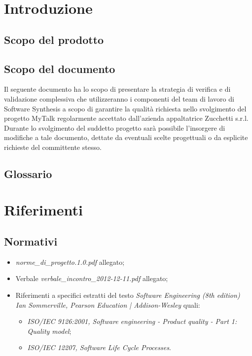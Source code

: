

\setcounter{page}{1}
\pagestyle{normal}

\section{Introduzione}
\subsection{Scopo del prodotto}
\purpose

\subsection{Scopo del documento}
Il seguente documento ha lo scopo di presentare la strategia di verifica e di validazione complessiva che utilizzeranno i componenti del team di lavoro di Software Synthesis a scopo di garantire la qualità richiesta nello svolgimento del progetto MyTalk regolarmente accettato dall'azienda appaltatrice Zucchetti s.r.l.\\
Durante lo svolgimento del suddetto progetto sarà possibile l'insorgere di modifiche a tale documento, dettate da eventuali scelte progettuali o da esplicite richieste del committente stesso.
\subsection{Glossario}
\glossaryIntro
\clearpage
\section{Riferimenti}
\subsection{Normativi}
\begin{itemize}
\item[] \textit{norme\_di\_progetto.1.0.pdf} allegato;
\item[]  Verbale \textit{verbale\_incontro\_2012-12-11.pdf} allegato;
\item[]  Riferimenti a specifici estratti del testo \textit{Software Engineering (8th edition) Ian Sommerville, Pearson Education | Addison-Wesley} quali:
\begin{itemize}
\item[]  \textit{ISO/IEC 9126:2001, Software engineering - Product quality - Part 1: Quality model};
\item[]  \textit{ISO/IEC 12207, Software Life Cycle Processes}.
\end{itemize}
\end{itemize}
